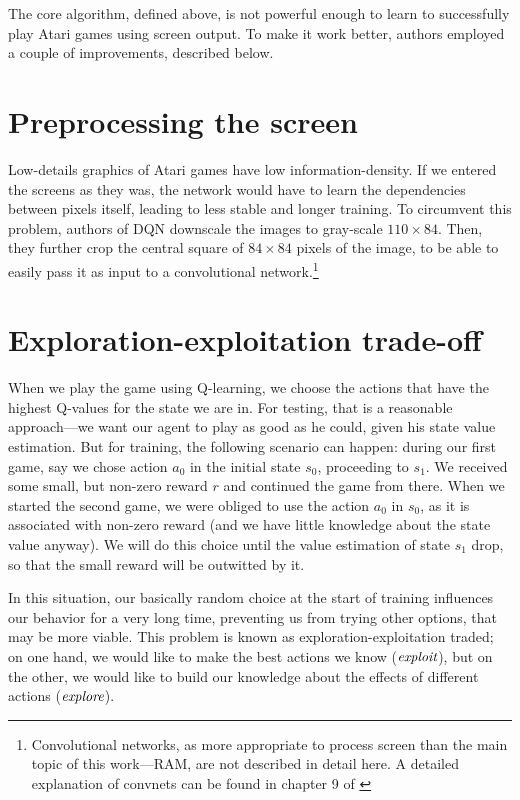 The core algorithm, defined above, is not powerful enough to learn to successfully play Atari games using screen output. To make it work better, authors employed a couple of improvements, described below.

\section{Preprocessing the screen}
Low-details graphics of Atari games have low information-density. If we entered the screens as they was, the network would have to learn the dependencies between pixels itself, leading to less stable and longer training. To circumvent this problem, authors of DQN downscale the images to gray-scale $110 \times 84$. Then, they further crop the central square of $84 \times 84$ pixels of the image, to be able to easily pass it as input to a convolutional network.\footnote{Convolutional networks, as more appropriate to process screen than the main topic of this work---RAM, are not described in detail here. A detailed explanation of convnets can be found in chapter 9 of \cite{dlbook}}

\section{Exploration-exploitation trade-off}
When we play the game using Q-learning, we choose the actions that have the highest Q-values for the state we are in. For testing, that is a reasonable approach---we want our agent to play as good as he could, given his state value estimation. But for training, the following scenario can happen: during our first game, say we chose action $a_0$ in the initial state $s_0$, proceeding to $s_1$. We received some small, but non-zero reward $r$ and continued the game from there. When we started the second game, we were obliged to use the action $a_0$ in $s_0$, as it is associated with non-zero reward (and we have little knowledge about the state value anyway). We will do this choice until the value estimation of state $s_1$ drop, so that the small reward will be outwitted by it.

In this situation, our basically random choice at the start of training influences our behavior for a very long time, preventing us from trying other options, that may be more viable. This problem is known as exploration-exploitation traded; on one hand, we would like to make the best actions we know ($\emph{exploit}$), but on the other, we would like to build our knowledge about the effects of different actions ($\emph{explore}$).

